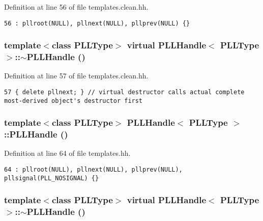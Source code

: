 Definition at line 56 of file templates.clean.hh.



\footnotesize\begin{verbatim}56 : pllroot(NULL), pllnext(NULL), pllprev(NULL) {} 
\end{verbatim}\normalsize 
{}
\subsubsection{\setlength{\rightskip}{0pt plus 5cm}template$<$class PLLType$>$ virtual PLLHandle$<$ {\bf PLLType} $>$::$\sim$PLLHandle ()\hspace{0.3cm}{\tt  [inline, protected, virtual]}}\label{classPLLHandle_b3}




Definition at line 57 of file templates.clean.hh.



\footnotesize\begin{verbatim}57 { delete pllnext; } // virtual destructor calls actual complete most-derived object's destructor first
\end{verbatim}\normalsize 
{}
\subsubsection{\setlength{\rightskip}{0pt plus 5cm}template$<$class PLLType$>$ PLLHandle$<$ {\bf PLLType} $>$::PLLHandle ()\hspace{0.3cm}{\tt  [inline, protected]}}\label{classPLLHandle_b4}




Definition at line 64 of file templates.hh.



\footnotesize\begin{verbatim}64 : pllroot(NULL), pllnext(NULL), pllprev(NULL), pllsignal(PLL_NOSIGNAL) {}
\end{verbatim}\normalsize 
{}
\subsubsection{\setlength{\rightskip}{0pt plus 5cm}template$<$class PLLType$>$ virtual PLLHandle$<$ {\bf PLLType} $>$::$\sim$PLLHandle ()\hspace{0.3cm}{\tt  [inline, protected, virtual]}}\label{classPLLHandle_b5}




